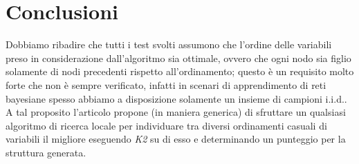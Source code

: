 \section{Conclusioni}

Dobbiamo ribadire che tutti i test svolti assumono che l'ordine delle variabili preso in
considerazione dall'algoritmo sia ottimale, ovvero che ogni nodo sia figlio solamente di nodi
precedenti rispetto all'ordinamento; questo è un requisito molto forte che non è sempre verificato,
infatti in scenari di apprendimento di reti bayesiane spesso abbiamo a disposizione solamente un
insieme di campioni i.i.d.. A tal proposito l'articolo propone (in maniera generica) di sfruttare
un qualsiasi algoritmo di ricerca locale per individuare tra diversi ordinamenti casuali di
variabili il migliore eseguendo \textit{K2} su di esso e determinando un punteggio per la struttura
generata.